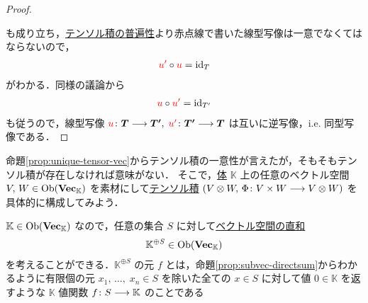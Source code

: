 \documentclass[rep_main]{subfiles}
\begin{document}
\begin{proof}
\begin{center}
	\end{center}
	も成り立ち，\hyperref[def:univ-vec-tensor]{テンソル積の普遍性}より赤点線で書いた線型写像は一意でなくてはならないので，
	\begin{align}
		\textcolor{red}{u'} \circ \textcolor{red}{u} = \mathrm{id}_T
	\end{align}
	がわかる．同様の議論から
	\begin{align}
		\textcolor{red}{u} \circ \textcolor{red}{u'} = \mathrm{id}_{T'}
	\end{align}
	も従うので，線型写像 $\textcolor{red}{u} \colon \bm{T} \longrightarrow \bm{T'},\; \textcolor{red}{u'} \colon \bm{T'} \longrightarrow \bm{T}$ は互いに逆写像，i.e. 同型写像である．
\end{proof}


命題\ref{prop:unique-tensor-vec}からテンソル積の一意性が言えたが，そもそもテンソル積が存在しなければ意味がない．
そこで，\hyperref[ax.ring]{体} $\mathbb{K}$ 上の任意のベクトル空間 $V,\, W \in \mathrm{Ob}(\bm{\mathrm{Vec}_{\mathbb{K}}})$ を素材にして\hyperref[def:univ-vec-tensor]{テンソル積} $(V \otimes W,\, \Phi \colon V \times W \longrightarrow V \otimes W)$ を具体的に構成してみよう．

$\mathbb{K} \in \mathrm{Ob}(\bm{\mathrm{Vec}_{\mathbb{K}}})$ なので，任意の集合 $S$ に対して\hyperref[def:univ-vec-sum]{ベクトル空間の直和}
\begin{align}
	\mathbb{K}^{\oplus S} \in \mathrm{Ob}(\bm{\mathrm{Vec}_{\mathbb{K}}})
\end{align}
を考えることができる．$\mathbb{K}^{\oplus S}$ の元 $f$ とは，命題\ref{prop:subvec-directsum}からわかるように有限個の元 $x_1,\, \dots,\; x_n \in S$ を除いた全ての $x \in S$ に対して値 $0 \in \mathbb{K}$ を返すような $\mathbb{K}$ 値関数
$f \colon S \longrightarrow \mathbb{K}$ のことである
\end{document}
